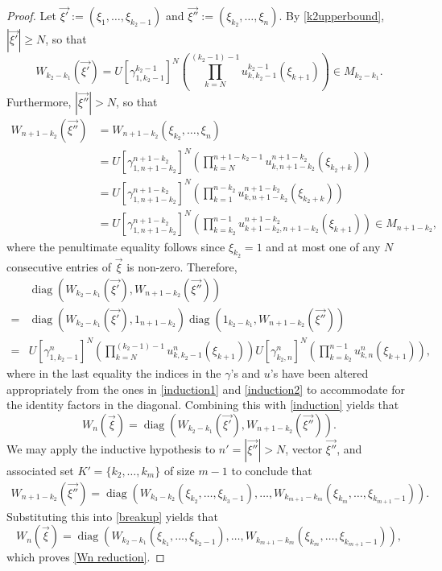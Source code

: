 \documentclass[12pt]{amsart}
\numberwithin{equation}{section}
\theoremstyle{definition}
\theoremstyle{remark}
\newcommand{\diag}{\operatorname{diag}}
\begin{document}
\begin{proof}
	Let $\vec{\xi'}:=(\xi_{1},\ldots,\xi_{k_{2}-1})$ and $\vec{\xi''}:=(\xi_{k_{2}},\ldots,\xi_{n})$. By \autoref{k2upperbound}, $|\vec{\xi'}|\geq N$, so that
	\begin{equation}
	\label{induction1}
	W_{k_{2}-k_{1}}(\vec{\xi'})=U[\gamma^{k_{2}-1}_{1,k_{2}-1}]^{N}\left(\prod_{k=N}^{(k_{2}-1)-1}u^{k_{2}-1}_{k,k_{2}-1}(\xi_{k+1})\right)\in M_{k_{2}-k_{1}}.
	\end{equation}
	Furthermore, $|\vec{\xi''}|>N$, so that
	\begin{equation}
	\label{induction2}
	\begin{aligned}
	W_{n+1-k_{2}}(\vec{\xi''})&=W_{n+1-k_{2}}(\xi_{k_{2}},\ldots,\xi_{n})\\
	&=U[\gamma^{n+1-k_{2}}_{1,n+1-k_{2}}]^{N}\left(\prod_{k=N}^{n+1-k_{2}-1}u^{n+1-k_{2}}_{k, n+1-k_{2}}(\xi_{k_{2}+k})\right)\\
	&=U[\gamma^{n+1-k_{2}}_{1,n+1-k_{2}}]^{N}\left(\prod_{k=1}^{n-k_{2}}u^{n+1-k_{2}}_{k, n+1-k_{2}}(\xi_{k_{2}+k})\right)\\
	&=U[\gamma^{n+1-k_{2}}_{1,n+1-k_{2}}]^{N}\left(\prod_{k=k_{2}}^{n-1}u^{n+1-k_{2}}_{k+1-k_{2}, n+1-k_{2}}(\xi_{k+1})\right)\in M_{n+1-k_{2}},
	\end{aligned}	
	\end{equation}
	where the penultimate equality follows since $\xi_{k_{2}}=1$ and at most one of any $N$ consecutive entries of $\vec{\xi}$ is non-zero. Therefore, 
	$$
	\begin{aligned}
	&\diag(W_{k_{2}-k_{1}}(\vec{\xi'}),W_{n+1-k_{2}}(\vec{\xi''}))\\
	=&\diag(W_{k_{2}-k_{1}}(\vec{\xi'}),1_{n+1-k_{2}})\diag(1_{k_{2}-k_{1}},W_{n+1-k_{2}}(\vec{\xi''}))\\
	=&U[\gamma^{n}_{1,k_{2}-1}]^{N}\left(\prod_{k=N}^{(k_{2}-1)-1}u^{n}_{k,k_{2}-1}(\xi_{k+1})\right) U[\gamma^{n}_{k_{2},n}]^{N}\left(\prod_{k=k_{2}}^{n-1}u^{n}_{k, n}(\xi_{k+1})\right),
	\end{aligned}
	$$
	where in the last equality the indices in the $\gamma$'s and $u$'s have been altered appropriately from the ones in \autoref{induction1} and \autoref{induction2} to accommodate for the identity factors in the diagonal. Combining this with \autoref{induction} yields that
	\begin{equation}
	\label{breakup}
	W_{n}(\vec{\xi})=\diag(W_{k_{2}-k_{1}}(\vec{\xi'}),W_{n+1-k_{2}}(\vec{\xi''})).
	\end{equation}
	We may apply the inductive hypothesis to $n'=|\vec{\xi''}|>N$, vector $\vec{\xi''}$, and associated set $K'=\{k_{2},\ldots,k_{m}\}$ of size $m-1$ to conclude that
	$$
	\begin{aligned}
	W_{n+1-k_{2}}(\vec{\xi''})
	=\diag\left(W_{k_{3}-k_{2}}(\xi_{k_{2}},\ldots,\xi_{k_{3}-1}),\ldots,W_{k_{m+1}-k_{m}}(\xi_{k_{m}},\ldots,\xi_{k_{m+1}-1})\right).
	\end{aligned}
	$$
	Substituting this into \autoref{breakup} yields that
	$$
	W_{n}(\vec{\xi})=\diag\left(W_{k_{2}-k_{1}}(\xi_{k_{1}},\ldots,\xi_{k_{2}-1}),\ldots,W_{k_{m+1}-k_{m}}(\xi_{k_{m}},\ldots,\xi_{k_{m+1}-1})\right),
	$$
	which proves \autoref{Wn reduction}. 
\end{proof}
\end{document}
